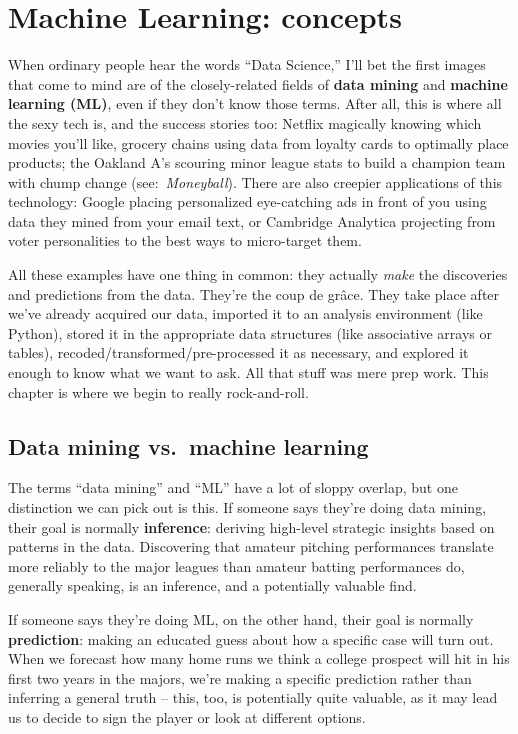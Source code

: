 
\chapter{Machine Learning: concepts}

When ordinary people hear the words ``Data Science,'' I'll bet the first images
that come to mind are of the closely-related fields of \textbf{data mining} and
\textbf{machine learning (ML)}, even if they don't know those terms. After all,
this is where all the sexy tech is, and the success stories too: Netflix
magically knowing which movies you'll like, grocery chains using data from
loyalty cards to optimally place products; the Oakland A's scouring minor
league stats to build a champion team with chump change
(see:~\textit{Moneyball}). There are also creepier applications of this
technology: Google placing personalized eye-catching ads in front of you using
data they mined from your email text, or Cambridge Analytica projecting from
voter personalities to the best ways to micro-target them.

All these examples have one thing in common: they actually \textit{make} the
discoveries and predictions from the data. They're the coup de gr\^{a}ce. They
take place after we've already acquired our data, imported it to an analysis
environment (like Python), stored it in the appropriate data structures (like
associative arrays or tables), recoded/transformed/pre-processed it as
necessary, and explored it enough to know what we want to ask. All that stuff
was mere prep work. This chapter is where we begin to really rock-and-roll.

\section{Data mining vs.~machine learning}

The terms ``data mining'' and ``ML'' have a lot of sloppy overlap, but one
distinction we can pick out is this. If someone says they're doing data mining,
their goal is normally \textbf{inference}: deriving high-level strategic
insights based on patterns in the data. Discovering that amateur pitching
performances translate more reliably to the major leagues than amateur batting
performances do, generally speaking, is an inference, and a potentially
valuable find.

If someone says they're doing ML, on the other hand, their goal is normally
\textbf{prediction}: making an educated guess about how a specific case will
turn out. When we forecast how many home runs we think a college prospect will
hit in his first two years in the majors, we're making a specific prediction
rather than inferring a general truth -- this, too, is potentially quite
valuable, as it may lead us to decide to sign the player or look at different
options.
